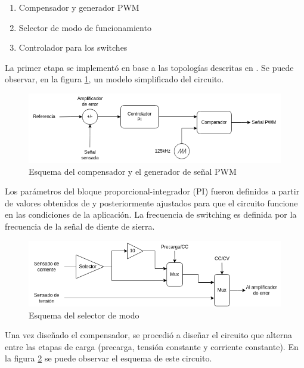 \begin{enumerate}
    \item Compensador y generador PWM
    \item Selector de modo de funcionamiento
    \item Controlador para los switches
\end{enumerate}

La primer etapa se implementó en base a las topologías descritas en \cite{mohan}. Se puede observar,
en la figura \ref{fig:esquema_compensador}, un modelo simplificado del circuito.

\begin{figure}
    \centering
    \includegraphics[width=\textwidth]{images/compensador.png}
    \caption{Esquema del compensador y el generador de señal PWM}
    \label{fig:esquema_compensador}
\end{figure}

Los parámetros del bloque proporcional-integrador (PI) fueron definidos a partir de valores obtenidos de \cite{mohan}
y posteriormente ajustados para que el circuito funcione en las condiciones de la aplicación.
La frecuencia de switching es definida por la frecuencia de la señal de diente de sierra.

\begin{figure}
    \centering
    \includegraphics[width=\textwidth]{images/selector.png}
    \caption{Esquema del selector de modo}
    \label{fig:esquema_selector}
\end{figure}

Una vez diseñado el compensador, se procedió a diseñar el circuito que alterna entre las etapas de carga (precarga, tensión constante y corriente constante).
En la figura \ref{fig:esquema_selector} se puede observar el esquema de este circuito.

